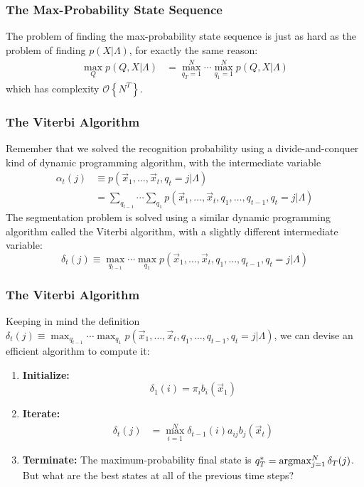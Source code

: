 \documentclass{beamer}
\newcommand{\argmax}{\operatornamewithlimits{argmax}}
\begin{document}
\begin{frame}
  \frametitle{The Max-Probability State Sequence}

  The problem of finding the max-probability state sequence is just as
  hard as the problem of finding $p(X|\Lambda)$, for exactly the same
  reason:
  \begin{align*}
    \max_Q p(Q,X|\Lambda) &= \max_{q_T=1}^N\cdots\max_{q_1=1}^N p(Q,X|\Lambda)
  \end{align*}
  which has complexity ${\mathcal O}\left\{N^T\right\}$.
\end{frame}
\begin{frame}
  \frametitle{The Viterbi Algorithm}
  
  Remember that we solved the recognition probability using a
  divide-and-conquer kind of dynamic programming algorithm, with the
  intermediate variable
  \begin{align*}
  \alpha_t(j) &\equiv p(\vec{x}_1,\ldots,\vec{x}_t,q_t=j|\Lambda)\\
  &=\sum_{q_{t-1}}\cdots\sum_{q_1}
  p(\vec{x}_1,\ldots,\vec{x}_t,q_1,\ldots,q_{t-1},q_t=j|\Lambda)
  \end{align*}
  The segmentation problem is solved using a similar dynamic
  programming algorithm called the Viterbi algorithm, with a slightly
  different intermediate variable:
  \[
  \delta_t(j)\equiv \max_{q_{t-1}}\cdots\max_{q_1}
  p(\vec{x}_1,\ldots,\vec{x}_t,q_1,\ldots,q_{t-1},q_t=j|\Lambda)
  \]
\end{frame}

\begin{frame}
  \frametitle{The Viterbi Algorithm}
  Keeping in mind the definition
  $\delta_t(j)\equiv\max_{q_{t-1}}\cdots\max_{q_1}p(\vec{x}_1,\ldots,\vec{x}_t,q_1,\ldots,q_{t-1},q_t=j|\Lambda)$,
  we can devise an efficient algorithm to compute it:
  \begin{enumerate}
  \item {\bf Initialize:}
    \[
    \delta_1(i) = \pi_i b_i(\vec{x}_1)
    \]
  \item {\bf Iterate:}
    \begin{align*}
      \delta_{t}(j) &= \max_{i=1}^N \delta_{t-1}(i) a_{ij}b_j(\vec{x}_t)
    \end{align*}
  \item {\bf Terminate:}
    The maximum-probability final state is $q_T^* = \argmax_{j=1}^N \delta_T(j)$.  But what
    are the best states at all of the previous time steps?
  \end{enumerate}
\end{frame}
\end{document}
